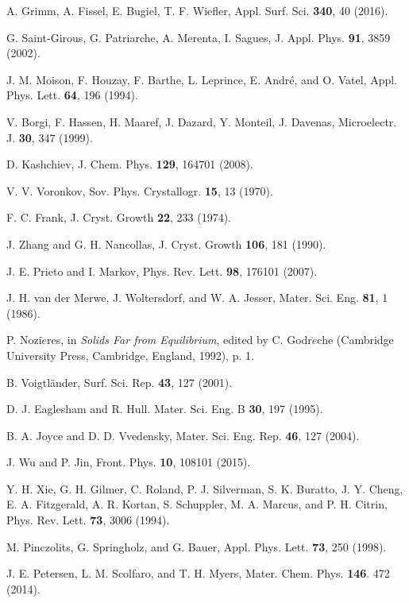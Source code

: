 \documentclass[aps,prl,showpacs,twocolumn,byrevtex,floatfix]{revtex4-1}
\begin{document}
\begin{thebibliography}{99}
A. Grimm, A. Fissel, E. Bugiel, T. F. Wiefler, Appl. Surf. Sci. {\bf 340}, 40
(2016).

G. Saint-Girous, G. Patriarche, A. Merenta, I. Sagues, J. Appl. Phys. {\bf 91},
3859 (2002).

J. M. Moison, F. Houzay, F. Barthe, L. Leprince, E. Andr\'e, and O. Vatel, Appl.
Phys. Lett. {\bf 64}, 196 (1994).

V. Borgi, F. Hassen, H. Maaref, J. Dazard, Y. Monteil, J. Davenas, Microelectr.
J. {\bf 30}, 347 (1999).

D. Kashchiev, J. Chem. Phys. {\bf 129}, 164701 (2008).

V. V. Voronkov, Sov. Phys. Crystallogr. {\bf 15}, 13 (1970).

F. C. Frank, J. Cryst. Growth {\bf 22}, 233 (1974).

J. Zhang and G. H. Nancollas, J. Cryst. Growth {\bf 106}, 181 (1990).

J. E. Prieto and I. Markov, Phys. Rev. Lett. {\bf 98}, 176101 (2007).

J. H. van der Merwe, J. Woltersdorf, and W. A. Jesser, Mater. Sci. Eng. {\bf
81}, 1 (1986).

P. Nozi$\grave{e}$res, in {\it Solids Far from Equilibrium}, edited by C.
Godr$\grave{e}$che (Cambridge University Press, Cambridge, England, 1992), p. 1.

B. Voigtl\"ander, Surf. Sci. Rep. {\bf 43}, 127 (2001).

D. J. Eaglesham and R. Hull. Mater. Sci. Eng. B {\bf 30}, 197 (1995).

B. A. Joyce and D. D. Vvedensky, Mater. Sci. Eng. Rep. {\bf 46}, 127 (2004).

J. Wu and P. Jin, Front. Phys. {\bf 10}, 108101 (2015).


Y. H. Xie, G. H. Gilmer, C. Roland, P. J. Silverman, S. K. Buratto, J. Y. Cheng,
E. A. Fitzgerald, A. R. Kortan, S. Schuppler, M. A. Marcus, and P. H. Citrin,
Phys. Rev. Lett. {\bf 73}, 3006 (1994).

M. Pinczolits, G. Springholz, and G. Bauer, Appl. Phys. Lett. {\bf 73}, 250
(1998).

J. E. Petersen, L. M. Scolfaro, and T. H. Myers, Mater. Chem. Phys. {\bf 146}.
472 (2014).


\end{thebibliography}
\end{document}
